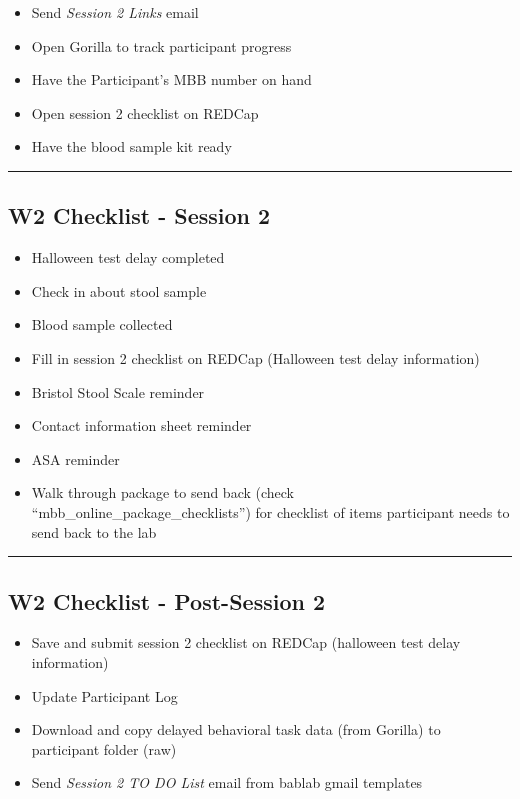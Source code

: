 \documentclass[]{book}
\providecommand{\tightlist}{%
  \setlength{\itemsep}{0pt}\setlength{\parskip}{0pt}}
\begin{document}
\begin{itemize}
\tightlist
\item
  Send \emph{Session 2 Links} email
\item
  Open Gorilla to track participant progress
\item
  Have the Participant's MBB number on hand
\item
  Open session 2 checklist on REDCap
\item
  Have the blood sample kit ready
\end{itemize}

\begin{center}\rule{0.5\linewidth}{0.5pt}\end{center}

\hypertarget{w2-checklist---session-2}{%
\subsection{W2 Checklist - Session 2}\label{w2-checklist---session-2}}

\begin{itemize}
\tightlist
\item
  Halloween test delay completed
\item
  Check in about stool sample
\item
  Blood sample collected\\
\item
  Fill in session 2 checklist on REDCap (Halloween test delay information)
\item
  Bristol Stool Scale reminder
\item
  Contact information sheet reminder
\item
  ASA reminder
\item
  Walk through package to send back (check ``mbb\_online\_package\_checklists'') for checklist of items participant needs to send back to the lab
\end{itemize}

\begin{center}\rule{0.5\linewidth}{0.5pt}\end{center}

\hypertarget{w2-checklist---post-session-2}{%
\subsection{W2 Checklist - Post-Session 2}\label{w2-checklist---post-session-2}}

\begin{itemize}
\tightlist
\item
  Save and submit session 2 checklist on REDCap (halloween test delay information)
\item
  Update Participant Log
\item
  Download and copy delayed behavioral task data (from Gorilla) to participant folder (raw)
\item
  Send \emph{Session 2 TO DO List} email from bablab gmail templates
\end{itemize}
\end{document}
